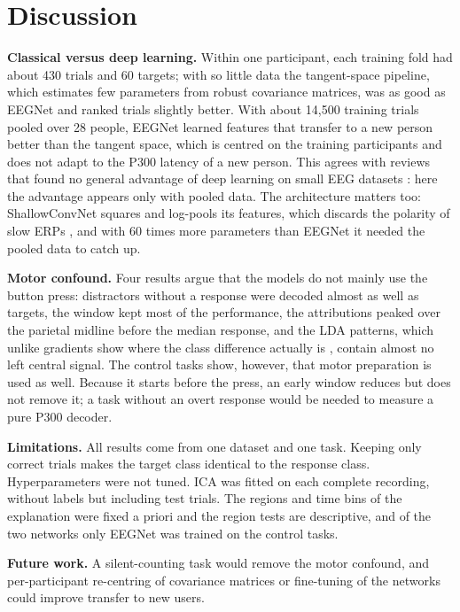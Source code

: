 \section{Discussion}
\label{ch:discussion}

\textbf{Classical versus deep learning.} Within one participant, each training fold had about 430 trials and 60 targets; with so little data the tangent-space pipeline, which estimates few parameters from robust covariance matrices, was as good as EEGNet and ranked trials slightly better. With about 14,500 training trials pooled over 28 people, EEGNet learned features that transfer to a new person better than the tangent space, which is centred on the training participants and does not adapt to the P300 latency of a new person. This agrees with reviews that found no general advantage of deep learning on small EEG datasets \citep{lotte2018,roy2019}: here the advantage appears only with pooled data. The architecture matters too: ShallowConvNet squares and log-pools its features, which discards the polarity of slow ERPs \citep{schirrmeister2017}, and with 60 times more parameters than EEGNet it needed the pooled data to catch up.

\textbf{Motor confound.} Four results argue that the models do not mainly use the button press: distractors without a response were decoded almost as well as targets, the  window kept most of the performance, the attributions peaked over the parietal midline before the median response, and the LDA patterns, which unlike gradients show where the class difference actually is \citep{haufe2014}, contain almost no left central signal. The control tasks show, however, that motor preparation is used as well. Because it starts before the press, an early window reduces but does not remove it; a task without an overt response would be needed to measure a pure P300 decoder.

\textbf{Limitations.} All results come from one dataset and one task. Keeping only correct trials makes the target class identical to the response class. Hyperparameters were not tuned. ICA was fitted on each complete recording, without labels but including test trials. The regions and time bins of the explanation were fixed a priori and the region tests are descriptive, and of the two networks only EEGNet was trained on the control tasks.

\textbf{Future work.} A silent-counting task would remove the motor confound, and per-participant re-centring of covariance matrices or fine-tuning of the networks could improve transfer to new users.
